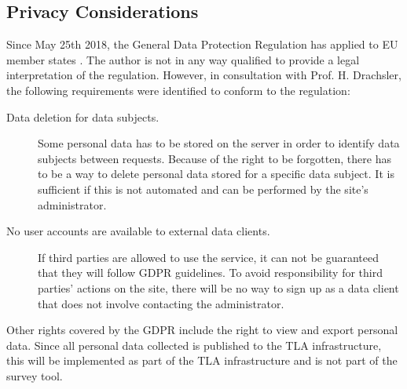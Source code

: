\subsection{Privacy Considerations}
 Since May 25th 2018, the General Data Protection Regulation has applied to EU member states \cite{gdpr-info}.
 The author is not in any way qualified to provide a legal interpretation of the regulation.
 However, in consultation with Prof. H. Drachsler, the following requirements
 were identified to conform to the regulation:

 \begin{description}
     \item[Data deletion for data subjects.] Some personal data has to be stored
     on the server in order to identify data subjects between requests. Because of the
     right to be forgotten, there has to be a way to delete personal data stored for
     a specific data subject. It is sufficient if this is not automated and can be performed
     by the site's administrator.
     \item[No user accounts are available to external data clients.] If third parties are allowed to use
     the service, it can not be guaranteed that they will follow GDPR guidelines.
     To avoid responsibility for third parties' actions on the site, there will
     be no way to sign up as a data client that does not involve contacting the administrator.
 \end{description}
 
 Other rights covered by the GDPR include the right to view and export personal data.
 Since all personal data collected is published to the TLA infrastructure,
 this will be implemented as part of the TLA infrastructure and is not
 part of the survey tool.
